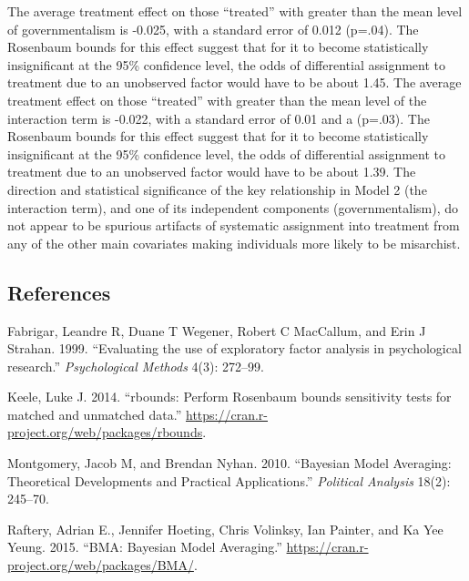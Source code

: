 \documentclass[12pt,]{article}
\begin{document}
The average treatment effect on those ``treated'' with greater than the
mean level of governmentalism is -0.025, with a standard error of 0.012
(p=.04). The Rosenbaum bounds for this effect suggest that for it to
become statistically insignificant at the 95\% confidence level, the
odds of differential assignment to treatment due to an unobserved factor
would have to be about 1.45. The average treatment effect on those
``treated'' with greater than the mean level of the interaction term is
-0.022, with a standard error of 0.01 and a (p=.03). The Rosenbaum
bounds for this effect suggest that for it to become statistically
insignificant at the 95\% confidence level, the odds of differential
assignment to treatment due to an unobserved factor would have to be
about 1.39. The direction and statistical significance of the key
relationship in Model 2 (the interaction term), and one of its
independent components (governmentalism), do not appear to be spurious
artifacts of systematic assignment into treatment from any of the other
main covariates making individuals more likely to be misarchist.

\clearpage

\subsection{References}

Fabrigar, Leandre R, Duane T Wegener, Robert C MacCallum, and Erin J
Strahan. 1999. ``Evaluating the use of exploratory factor analysis in
psychological research.'' \emph{Psychological Methods} 4(3): 272--99.

Keele, Luke J. 2014. ``rbounds: Perform Rosenbaum bounds sensitivity
tests for matched and unmatched data.''
\url{https://cran.r-project.org/web/packages/rbounds}.

Montgomery, Jacob M, and Brendan Nyhan. 2010. ``Bayesian Model
Averaging: Theoretical Developments and Practical Applications.''
\emph{Political Analysis} 18(2): 245--70.

Raftery, Adrian E., Jennifer Hoeting, Chris Volinksy, Ian Painter, and Ka Yee Yeung. 2015. ``BMA: Bayesian Model Averaging.''
\url{https://cran.r-project.org/web/packages/BMA/}.
\end{document}
